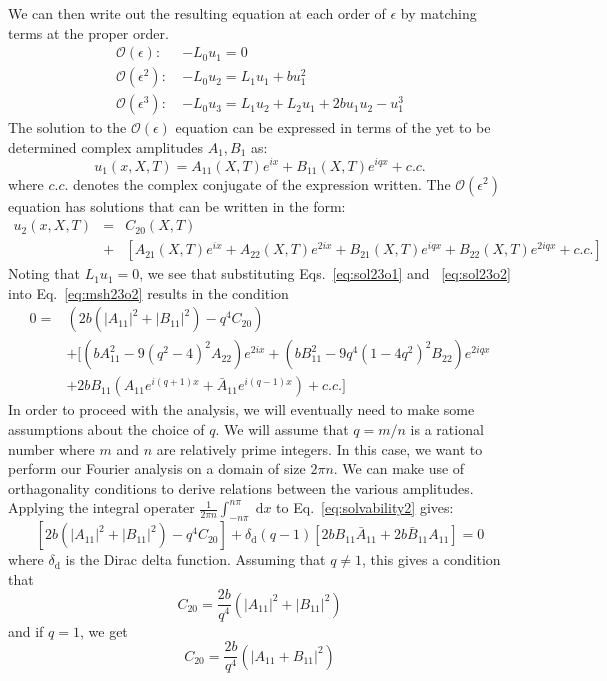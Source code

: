 \documentclass[api,pof,pre,12pt,a4paper]{revtex4-1}
\newcommand{\beqn}{\begin{equation}}
\newcommand{\eeqn}{\end{equation}}
\newcommand{\beqa}{\begin{eqnarray}}
\newcommand{\eeqa}{\end{eqnarray}}
\begin{document}
We can then write out the resulting equation at each order of $\epsilon$ by matching terms at the proper order.
\begin{subequations}
\begin{align}
\mathcal{O}(\epsilon): \:  &-L_0 u_1 =0
\label{eq:msh23o1} \\
\mathcal{O}(\epsilon^2): \: &-L_0 u_2 = L_1 u_1 +b u_1^2
\label{eq:msh23o2} \\
\mathcal{O}(\epsilon^3): \:  &-L_0 u_3 = L_1 u_2 +L_2 u_1 + 2b u_1 u_2-u_1^3
\label{eq:msh23o3}
\end{align}
\end{subequations}
The solution to the $\mathcal{O}(\epsilon)$ equation can be expressed in terms of the yet to be determined complex amplitudes $A_1, B_1$ as:
\beqn
u_1(x,X,T)=A_{11}(X,T)e^{i x} +B_{11}(X,T)e^{i q x} +c.c.
\label{eq:sol23o1}
\eeqn
where $c.c.$ denotes the complex conjugate of the expression written.  The  $\mathcal{O}(\epsilon^2)$ equation has solutions that can be written in the form:
\beqa
u_2(x,X,T)&=&C_{20}(X,T)  \\
&+ &\left[ A_{21}(X,T)e^{i x}+A_{22}(X,T)e^{2 i x} +B_{21}(X,T)e^{i q x} + B_{22}(X,T)e^{2 i q x} +c.c.\right]\nonumber
\label{eq:sol23o2}
\eeqa
Noting that $L_1 u_1=0$, we see that substituting Eqs.~\ref{eq:sol23o1} and ~\ref{eq:sol23o2} into Eq.~\ref{eq:msh23o2} results in the condition
\begin{align}
	0=& \left(2 b (|A_{11}|^2+|B_{11}|^2)-q^4 C_{20} \right) \nonumber \\
 &+\biggl[ \left(b A_{11}^2-9(q^2-4)^2A_{22}\right)e^{2 i x} +\left(b B_{11}^2-9q^4 (1-4q^2)^2 B_{22}\right)e^{2 i q x} \nonumber \\
&+2b B_{11}\left(A_{11}e^{i(q+1)x}+\bar{A}_{11}e^{i(q-1)x} \right)+ c.c.\biggr]
\label{eq:solvability2}
\end{align}
In order to proceed with the analysis, we will eventually need to make some assumptions about the choice of $q$.  We will assume that $q=m/n$ is a rational number where $m$ and $n$ are relatively prime integers. In this case, we want to perform our Fourier analysis on a domain of size $2\pi n$.
We can make use of orthagonality conditions to derive relations between the various amplitudes.  Applying the integral operater $\tfrac{1}{2\pi n}\int_{-n\pi }^{ n\pi} \; \text{d}x$ to Eq.~\ref{eq:solvability2} gives:
\beqn
 \left[2 b (|A_{11}|^2+|B_{11}|^2)-q^4 C_{20} \right] +\delta_{\text{d}}(q-1) \left[2  b B_{11} \bar{A}_{11}+2  b\bar{B}_{11} A_{11} \right]=0
\eeqn
where $\delta_{\text{d}}$ is the Dirac delta function.
Assuming that $q\neq 1$, this gives a condition that 
\beqn
C_{20}=\frac{2 b}{q^4} (|A_{11}|^2+|B_{11}|^2)
\eeqn
and if $q=1$, we get
\beqn
C_{20}=\frac{2 b}{q^4} (|A_{11}+B_{11}|^2)
\eeqn
\end{document}
